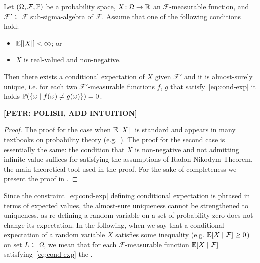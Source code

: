 \begin{proposition}
\label{prop:conditional-exp-existence}
Let $(\Omega,\mathcal{F},\mathbb{P})$ be a probability space, 
$X\colon\Omega\rightarrow 
\mathbb{R}$ an $\mathcal{F}$-measurable function, and $\mathcal{F}'\subseteq 
\mathcal{F}$ sub-sigma-algebra of $\mathcal{F}$. Assume that one of the following conditions hold:
\begin{itemize}
\item $\mathbb{E}[|X|]<\infty$; or
\item $X$ is real-valued and non-negative.
\end{itemize}
Then there exists a conditional expectation of $X$ given $\mathcal{F}'$ and it is almost-surely unique, i.e. for each two $\mathcal{F}'$-measurable functions $f$, $g$ that satisfy~\eqref{eq:cond-exp} it holds $\mathbb{P}(\{\omega\mid f(\omega)\neq g(\omega)\})=0$.
\end{proposition}
\textbf{[PETR: POLISH, ADD INTUITION]}
\begin{proof}
The proof for the case when $\mathbb{E}[|X|]$ is standard and appears in many textbooks on probability theory (e.g.~\cite{Billingsley:book,Ash:book,Rosenthal:book}). The proof for the second case is essentially the same: the condition that $X$ is non-negative and not admitting infinite value suffices for satisfying the assumptions of Radon-Nikodym Theorem, the main theoretical tool used in the proof. For the sake of completeness we present the proof in \AppendixMaterial.
\end{proof}

Since the constraint~\eqref{eq:cond-exp} defining conditional expectation is phrased in terms of expected values, the almost-sure uniqueness cannot be strengthened to uniqueness, as re-defining a random variable on a set of probability zero does not change its expectation. In the following, when we say that a conditional expectation of a random variable $X$ satisfies some inequality (e.g. $\mathbb{E}[X\mid\mathcal{F}]\geq 0$) on set $L\subseteq \Omega$, we mean that for each $\mathcal{F}$-measurable function $\mathbb{E}[X\mid\mathcal{F}]$ satisfying~\eqref{eq:cond-exp} the .

